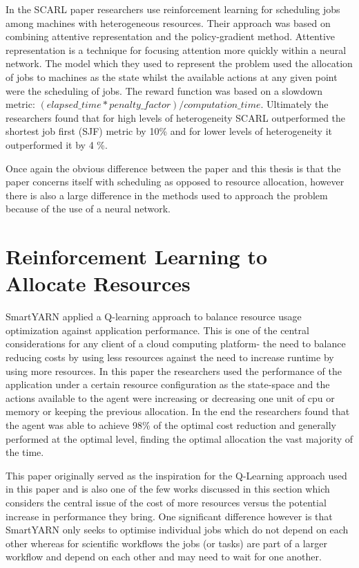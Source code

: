 In  the SCARL paper researchers use reinforcement learning for scheduling jobs among machines with heterogeneous resources. Their approach was based on combining attentive representation and the policy-gradient method. Attentive representation is a technique for focusing attention more quickly within a neural network. The model which they used to represent the problem used the allocation of jobs to machines as the state whilst the available actions at any given point were the scheduling of jobs. The reward function was based on a slowdown metric: $(elapsed\_time * penalty\_ factor) / computation\_time$. Ultimately the researchers found that for high levels of heterogeneity SCARL outperformed the shortest job first (SJF) metric by 10\% and for lower levels of heterogeneity it outperformed it by 4 \%.

Once again the obvious difference between the paper and this thesis is that the paper concerns itself with scheduling as opposed to resource allocation, however there is also a large difference in the methods used to approach the problem because of the use of a neural network. 

\section{Reinforcement Learning to Allocate Resources}
 \label{sec:rl_allocation}
 
SmartYARN applied a Q-learning approach to balance resource  usage optimization against application performance. This is one of the central considerations for any client of a cloud computing platform- the need to balance reducing costs by using less resources against the need to increase runtime by using more resources. In this paper the researchers used the performance of the application under a certain resource configuration as the state-space and the actions available to the agent were increasing or decreasing one unit of cpu or memory or keeping the previous allocation. In the end the researchers found that the agent was able to achieve 98\% of the optimal cost reduction and generally performed at the optimal level, finding the optimal allocation the vast majority of the time.

This paper originally served as the inspiration for the Q-Learning approach used in this paper and is also one of the few works discussed in this section which considers the central issue of the cost of more resources versus the potential increase in performance they bring. One significant difference however is that SmartYARN only seeks to optimise individual jobs which do not depend on each other whereas for scientific workflows the jobs (or tasks) are part of a larger workflow and depend on each other and may need to wait for one another.

